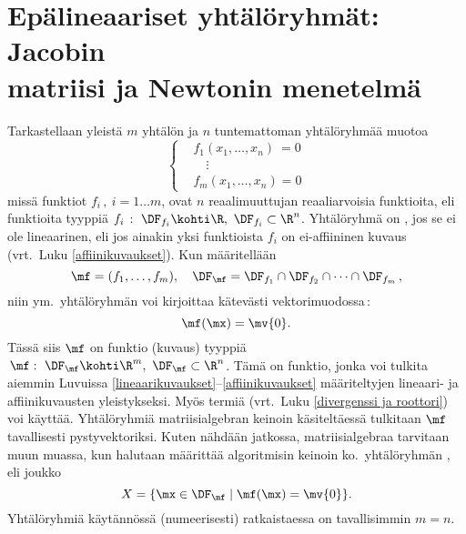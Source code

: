 \section[Epälineaariset yhtälöryhmät: Jacobin matriisi \\ ja Newtonin menetelmä]
{Epälineaariset yhtälöryhmät: Jacobin \\ matriisi ja Newtonin menetelmä}
\label{jacobiaani}
\alku

Tarkastellaan yleistä $m$ yhtälön ja $n$ tuntemattoman yhtälöryhmää muotoa
\[
\left\{ \begin{aligned}
&f_1(x_1,\ldots,x_n)\ =0 \\
&\quad\vdots \\
&f_m(x_1,\ldots,x_n)=0
\end{aligned} \right.
\]
missä funktiot $f_i\,,\ i=1 \ldots m$, ovat $n$ reaalimuuttujan reaaliarvoisia funktioita, eli 
funktioita tyyppiä $f_i\,:\ \DF_{f_i} \kohti \R,\ \DF_{f_i}\subset\R^n$. Yhtälöryhmä on 
 
, jos se ei ole lineaarinen, eli jos ainakin yksi funktioista $f_i$ on 
ei-affiininen kuvaus (vrt.\ Luku \ref{affiinikuvaukset}). Kun määritellään
\[
\mf = (f_1,\ldots,f_m), \quad \DF_\mf = \DF_{f_1}\cap\DF_{f_2}\cap\cdots\cap\DF_{f_m}\,,
\]
niin ym.\ yhtälöryhmän voi kirjoittaa kätevästi vektorimuodossa\,:
\[
\mf(\mx)=\mv{0}.
\]
Tässä siis $\mf$ on funktio (kuvaus) tyyppiä $\,\mf:\ \DF_\mf\kohti\R^m,\ \DF_\mf\subset\R^n$.
 
%
Tämä on  funktio, jonka voi tulkita aiemmin Luvuissa 
\ref{lineaarikuvaukset}--\ref{affiinikuvaukset} määriteltyjen lineaari- ja affiinikuvausten
%
yleistykseksi. Myös termiä  (vrt.\ Luku \ref{divergenssi ja roottori}) voi
käyttää. Yhtälöryhmiä matriisialgebran keinoin käsiteltäessä tulkitaan $\mf$ tavallisesti
pystyvektoriksi. Kuten nähdään jatkossa, matriisialgebraa tarvitaan muun muassa, kun halutaan
määrittää algoritmisin keinoin ko.\ yhtälöryhmän , eli joukko
\[
X=\{\mx\in\DF_\mf \mid \mf(\mx)=\mv{0}\}.
\]
Yhtälöryhmiä käytännössä (numeerisesti) ratkaistaessa on tavallisimmin $m=n$. 
